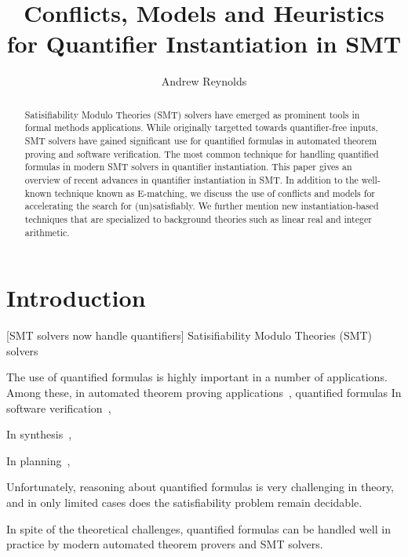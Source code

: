 \documentclass[oribibl]{llncs}
\begin{document}
\title{Conflicts, Models and Heuristics for Quantifier Instantiation in SMT}

\author {Andrew Reynolds}

\maketitle

\pagestyle{plain}

\begin{abstract}
Satisifiability Modulo Theories (SMT) solvers have
emerged as prominent tools in formal methods applications.
While originally targetted towards quantifier-free inputs,
SMT solvers have gained significant use for quantified formulas in automated
theorem proving and software verification.
The most common technique for handling quantified formulas in modern SMT solvers
in quantifier instantiation.
This paper gives an overview of recent advances in quantifier instantiation in SMT.
In addition to the well-known technique known as E-matching,
we discuss the use of conflicts and models for 
accelerating the search for (un)satisfiably.
We further mention new instantiation-based techniques
that are specialized to background theories such as linear real and integer arithmetic.
\end{abstract}

\section{Introduction}

[SMT solvers now handle quantifiers]
Satisifiability Modulo Theories (SMT) solvers 


The use of quantified formulas is highly important in a number of applications.
Among these, in automated theorem proving applications~\cite{},
quantified formulas
In software verification~\cite{},

In synthesis~\cite{},

In planning~\cite{},


Unfortunately, reasoning about quantified formulas is very challenging in theory, and
in only limited cases does the satisfiability problem remain decidable.


In spite of the theoretical challenges, quantified formulas
can be handled well in practice by modern automated theorem provers and SMT solvers.
\end{document}

